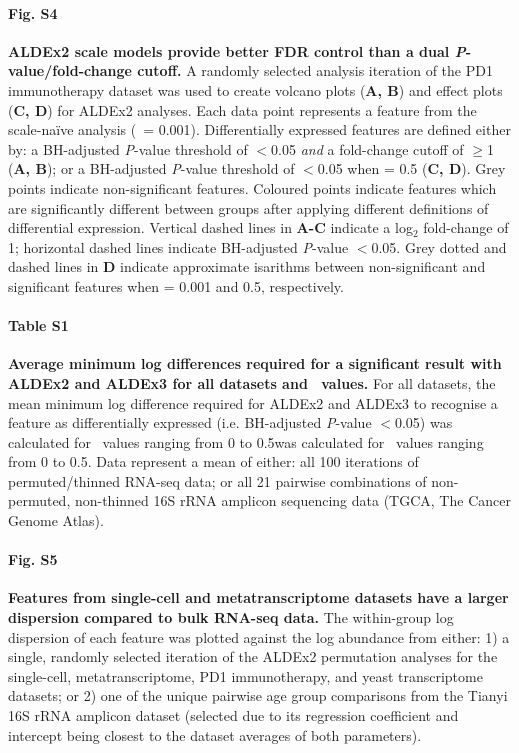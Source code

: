 \documentclass[10pt,letterpaper]{article}
\begin{document}
\paragraph*{Fig. S4}
\label{fig:supFigVolcanoEffectA2}
\textbf{ALDEx2 scale models provide better FDR control than a dual \textit{P}-value/fold-change cutoff.} A randomly selected analysis iteration of the PD1 immunotherapy dataset was used to create volcano plots (\textbf{A, B}) and effect plots (\textbf{C, D}) for ALDEx2 analyses. Each data point represents a feature from the scale-na\"ive analysis (\textgamma~= 0.001). Differentially expressed features are defined either by: a BH-adjusted \textit{P}-value threshold of $<$0.05 \textit{and} a fold-change cutoff of $\geq$1 (\textbf{A, B}); or a BH-adjusted \textit{P}-value threshold of $<$0.05 when \textgamma = 0.5 (\textbf{C, D}). Grey points indicate non-significant features. Coloured points indicate features which are significantly different between groups after applying different definitions of differential expression. Vertical dashed lines in \textbf{A-C} indicate a log$_2$ fold-change of 1; horizontal dashed lines indicate BH-adjusted \textit{P}-value $<$0.05. Grey dotted and dashed lines in \textbf{D} indicate approximate isarithms between non-significant and significant features when \textgamma{} = 0.001 and 0.5, respectively.

\paragraph*{Table S1}
\label{tab:supTabDensity}
\textbf{Average minimum log differences required for a significant result with ALDEx2 and ALDEx3 for all datasets and \textgamma~values.} For all datasets, the mean minimum log difference required for ALDEx2 and ALDEx3 to recognise a feature as differentially expressed (i.e. BH-adjusted \textit{P}-value $<$0.05) was calculated for \textgamma~values ranging from 0 to 0.5was calculated for \textgamma~values ranging from 0 to 0.5. Data represent a mean of either: all 100 iterations of permuted/thinned RNA-seq data; or all 21 pairwise combinations of non-permuted, non-thinned 16S rRNA amplicon sequencing data (TGCA, The Cancer Genome Atlas).

\paragraph*{Fig. S5}
\label{fig:supFigDispAbund}
\textbf{Features from single-cell and metatranscriptome datasets have a larger dispersion compared to bulk RNA-seq data.} The within-group log dispersion of each feature was plotted against the log abundance from either: 1) a single, randomly selected iteration of the ALDEx2 permutation analyses for the single-cell, metatranscriptome, PD1 immunotherapy, and yeast transcriptome datasets; or 2) one of the unique pairwise age group comparisons from the Tianyi 16S rRNA amplicon dataset (selected due to its regression coefficient and intercept being closest to the dataset averages of both parameters).
\end{document}

